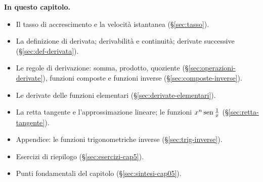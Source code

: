 \medskip
\noindent\textbf{In questo capitolo.}
\begin{itemize}
  \item Il tasso di accrescimento e la velocità istantanea (\S\ref{sec:tasso}).
  \item La definizione di derivata; derivabilità e continuità; derivate successive
  (\S\ref{sec:def-derivata}).
  \item Le regole di derivazione: somma, prodotto, quoziente (\S\ref{sec:operazioni-derivate}),
  funzioni composte e funzioni inverse (\S\ref{sec:composte-inverse}).
  \item Le derivate delle funzioni elementari (\S\ref{sec:derivate-elementari}).
  \item La retta tangente e l'approssimazione lineare; le funzioni $x^{n}\operatorname{sen}\frac1x$
  (\S\ref{sec:retta-tangente}).
  \item Appendice: le funzioni trigonometriche inverse (\S\ref{sec:trig-inverse}).
  \item Esercizi di riepilogo (\S\ref{sec:esercizi-cap5}).
  \item Punti fondamentali del capitolo (\S\ref{sec:sintesi-cap05}).
\end{itemize}










